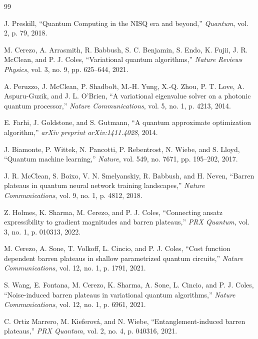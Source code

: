 \documentclass[pdflatex,sn-mathphys-num]{sn-jnl}
\theoremstyle{thmstyleone}
\theoremstyle{thmstyletwo}
\theoremstyle{thmstylethree}
\begin{document}
\renewcommand{\refname}{References}
\begin{thebibliography}{99}

J. Preskill, ``Quantum Computing in the NISQ era and beyond,'' \textit{Quantum}, vol. 2, p. 79, 2018.

M. Cerezo, A. Arrasmith, R. Babbush, S. C. Benjamin, S. Endo, K. Fujii, J. R. McClean, and P. J. Coles, ``Variational quantum algorithms,'' \textit{Nature Reviews Physics}, vol. 3, no. 9, pp. 625--644, 2021.

A. Peruzzo, J. McClean, P. Shadbolt, M.-H. Yung, X.-Q. Zhou, P. T. Love, A. Aspuru-Guzik, and J. L. O'Brien, ``A variational eigenvalue solver on a photonic quantum processor,'' \textit{Nature Communications}, vol. 5, no. 1, p. 4213, 2014.

E. Farhi, J. Goldstone, and S. Gutmann, ``A quantum approximate optimization algorithm,'' \textit{arXiv preprint arXiv:1411.4028}, 2014.

J. Biamonte, P. Wittek, N. Pancotti, P. Rebentrost, N. Wiebe, and S. Lloyd, ``Quantum machine learning,'' \textit{Nature}, vol. 549, no. 7671, pp. 195--202, 2017.

J. R. McClean, S. Boixo, V. N. Smelyanskiy, R. Babbush, and H. Neven, ``Barren plateaus in quantum neural network training landscapes,'' \textit{Nature Communications}, vol. 9, no. 1, p. 4812, 2018.

Z. Holmes, K. Sharma, M. Cerezo, and P. J. Coles, ``Connecting ansatz expressibility to gradient magnitudes and barren plateaus,'' \textit{PRX Quantum}, vol. 3, no. 1, p. 010313, 2022.

M. Cerezo, A. Sone, T. Volkoff, L. Cincio, and P. J. Coles, ``Cost function dependent barren plateaus in shallow parametrized quantum circuits,'' \textit{Nature Communications}, vol. 12, no. 1, p. 1791, 2021.

S. Wang, E. Fontana, M. Cerezo, K. Sharma, A. Sone, L. Cincio, and P. J. Coles, ``Noise-induced barren plateaus in variational quantum algorithms,'' \textit{Nature Communications}, vol. 12, no. 1, p. 6961, 2021.

C. Ortiz Marrero, M. Kieferov{\'a}, and N. Wiebe, ``Entanglement-induced barren plateaus,'' \textit{PRX Quantum}, vol. 2, no. 4, p. 040316, 2021.


\end{thebibliography}
\end{document}
